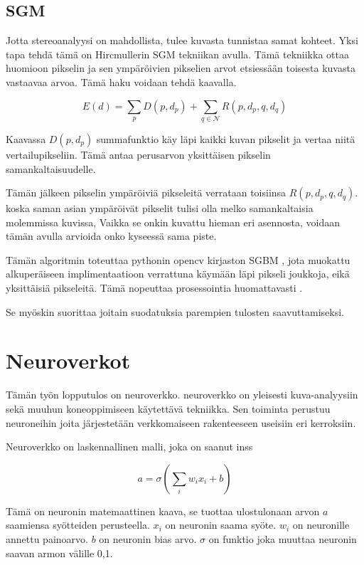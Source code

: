 \subsection{SGM}

Jotta stereoanalyysi on mahdollista,
tulee kuvasta tunnistaa samat kohteet.
Yksi tapa tehdä tämä on Hircmullerin SGM tekniikan avulla\cite{hirschmuller2005babel}.
Tämä tekniikka ottaa huomioon pikselin ja sen ympäröivien pikselien arvot etsiessään toisesta kuvasta vastaavaa arvoa. Tämä haku voidaan tehdä kaavalla.

\begin{equation}\label{yht:SGM}
    E(d) = \sum_{p} D(p, d_p) + \sum_{q \in \mathcal{N}} R(p, d_p, q, d_q)
\end{equation}

Kaavassa \(D(p, d_p)\) summafunktio käy läpi kaikki kuvan pikselit ja vertaa niitä vertailupikseliin.
Tämä antaa perusarvon yksittäisen pikselin samankaltaisuudelle.

Tämän jälkeen pikselin ympäröiviä pikseleitä verrataan toisiinsa \(R(p, d_p, q, d_q)\).
koska saman asian ympäröivät pikselit tulisi olla melko samankaltaisia molemmissa kuvissa, 
Vaikka se onkin kuvattu hieman eri asennosta, voidaan tämän avulla arvioida onko kyseessä sama piste.

Tämän algoritmin toteuttaa pythonin opencv kirjaston SGBM \cite{opencvsgbm},
jota muokattu alkuperäiseen implimentaatioon verrattuna käymään läpi pikseli joukkoja, eikä yksittäisiä pikseleitä.
Tämä nopeuttaa prosessointia huomattavasti \cite{MemoryEfficientSGM}.

Se myöskin suorittaa joitain suodatuksia parempien tulosten saavuttamiseksi.

\section{Neuroverkot} 


Tämän työn lopputulos on neuroverkko.
neuroverkko on yleisesti kuva-analyysiin sekä muuhun koneoppimiseen käytettävä tekniikka.
Sen toiminta perustuu neuroneihin joita järjestetään verkkomaiseen rakenteeseen useisiin eri kerroksiin.

Neuroverkko on laskennallinen malli, joka on saanut inss


\begin{equation}\label{yht:neuroni}
    a = \sigma\left(\sum_i w_i x_i + b\right)
\end{equation}

Tämä on neuronin matemaattinen kaava,
se tuottaa ulostulonaan arvon \(a\) saamiensa syötteiden perusteella.
\(x_i\) on neuronin saama syöte.
\(w_i\) on neuronille annettu painoarvo.
\(b\) on neuronin bias arvo. \(\sigma\) on funktio joka muuttaa neuronin saavan armon välille 0,1.

